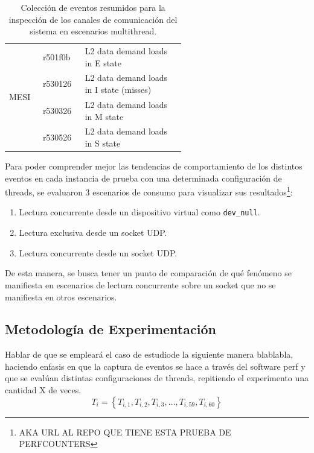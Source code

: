 \begin{table}[]
\begin{tabular}{|l|l|p{0.58\linewidth}|}
\multirow{4}{*}{MESI}               & r501f0b  & L2 data demand loads in E state                            \\ \cline{2-3} 
                                    & r530126  & L2 data demand loads in I state (misses)                   \\ \cline{2-3} 
                                    & r530326  & L2 data demand loads in M state                            \\ \cline{2-3} 
                                    & r530526  & L2 data demand loads in S state                            \\ \hline
\end{tabular}
\caption{Colección de eventos resumidos para la inspección de los canales de comunicación del sistema en escenarios multithread.}
\label{table:codigoseventos}
\end{table}

Para poder comprender mejor las tendencias de comportamiento de los distintos eventos en cada instancia de prueba con una determinada configuración de threads, se evaluaron 3 escenarios de consumo para visualizar sus resultados\footnote{AKA URL AL REPO QUE TIENE ESTA PRUEBA DE PERFCOUNTERS}:
\begin{enumerate}
\item Lectura concurrente desde un dispositivo virtual como \verb=dev_null=.
\item Lectura exclusiva desde un socket UDP.
\item Lectura concurrente desde un socket UDP.
\end{enumerate}

De esta manera, se busca tener un punto de comparación de qué fenómeno se manifiesta en escenarios de lectura concurrente sobre un socket que no se manifiesta en otros escenarios.

\subsection{Metodología de Experimentación}
Hablar de que se empleará el caso de estudiode la siguiente manera blablabla, haciendo enfasis en que la captura de eventos se hace a través del software perf y que se evalúan distintas configuraciones de threads, repitiendo el experimento una cantidad X de veces.
\begin{equation}
T_i = \left\{ T_{i,1},T_{i,2},T_{i,3}, \dots ,T_{i,59}, T_{i,60}\right\} 
\end{equation}

